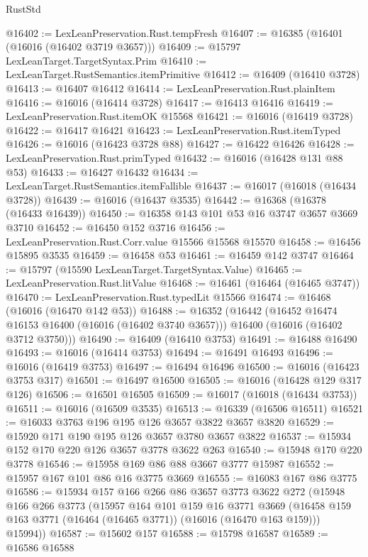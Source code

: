 \begin{lexlean}{RustStd}
\begin{coremodule}
@16402 := LexLeanPreservation.Rust.tempFresh
@16407 := @16385 (@16401 (@16016 (@16402 @3719 @3657)))
@16409 := @15797 LexLeanTarget.TargetSyntax.Prim
@16410 := LexLeanTarget.RustSemantics.itemPrimitive
@16412 := @16409 (@16410 @3728)
@16413 := @16407 @16412
@16414 := LexLeanPreservation.Rust.plainItem
@16416 := @16016 (@16414 @3728)
@16417 := @16413 @16416
@16419 := LexLeanPreservation.Rust.itemOK @15568
@16421 := @16016 (@16419 @3728)
@16422 := @16417 @16421
@16423 := LexLeanPreservation.Rust.itemTyped
@16426 := @16016 (@16423 @3728 @88)
@16427 := @16422 @16426
@16428 := LexLeanPreservation.Rust.primTyped
@16432 := @16016 (@16428 @131 @88 @53)
@16433 := @16427 @16432
@16434 := LexLeanTarget.RustSemantics.itemFallible
@16437 := @16017 (@16018 (@16434 @3728))
@16439 := @16016 (@16437 @3535)
@16442 := @16368 (@16378 (@16433 @16439))
@16450 := @16358 @143 @101 @53 @16 @3747 @3657 @3669 @3710
@16452 := @16450 @152 @3716
@16456 := LexLeanPreservation.Rust.Corr.value @15566 @15568 @15570
@16458 := @16456 @15895 @3535
@16459 := @16458 @53
@16461 := @16459 @142 @3747
@16464 := @15797 (@15590 LexLeanTarget.TargetSyntax.Value)
@16465 := LexLeanPreservation.Rust.litValue
@16468 := @16461 (@16464 (@16465 @3747))
@16470 := LexLeanPreservation.Rust.typedLit @15566
@16474 := @16468 (@16016 (@16470 @142 @53))
@16488 := @16352
    (@16442
      (@16452 @16474 @16153 @16400 (@16016 (@16402 @3740 @3657)))
      @16400
      (@16016 (@16402 @3712 @3750)))
@16490 := @16409 (@16410 @3753)
@16491 := @16488 @16490
@16493 := @16016 (@16414 @3753)
@16494 := @16491 @16493
@16496 := @16016 (@16419 @3753)
@16497 := @16494 @16496
@16500 := @16016 (@16423 @3753 @317)
@16501 := @16497 @16500
@16505 := @16016 (@16428 @129 @317 @126)
@16506 := @16501 @16505
@16509 := @16017 (@16018 (@16434 @3753))
@16511 := @16016 (@16509 @3535)
@16513 := @16339 (@16506 @16511)
@16521 := @16033 @3763 @196 @195 @126 @3657 @3822 @3657 @3820
@16529 := @15920 @171 @190 @195 @126 @3657 @3780 @3657 @3822
@16537 := @15934 @152 @170 @220 @126 @3657 @3778 @3622 @263
@16540 := @15948 @170 @220 @3778
@16546 := @15958 @169 @86 @88 @3667 @3777 @15987
@16552 := @15957 @167 @101 @86 @16 @3775 @3669
@16555 := @16083 @167 @86 @3775
@16586 := @15934
    @157
    @166
    @266
    @86
    @3657
    @3773
    @3622
    @272
    (@15948
      @166
      @266
      @3773
      (@15957
        @164
        @101
        @159
        @16
        @3771
        @3669
        (@16458 @159 @163 @3771 (@16464 (@16465 @3771)) (@16016 (@16470 @163 @159)))
        @15994))
@16587 := @15602 @157
@16588 := @15798 @16587
@16589 := @16586 @16588

\end{coremodule}
\end{lexlean}
